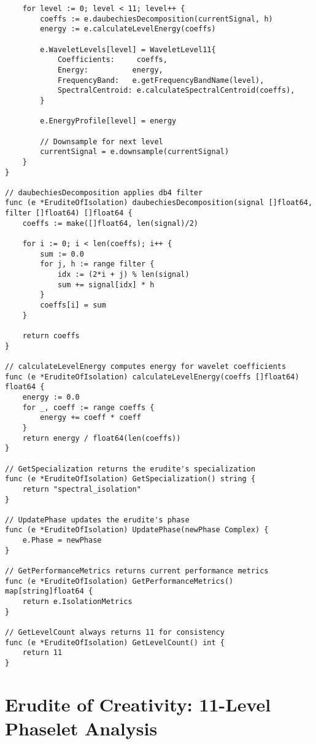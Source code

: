 \begin{tcolorbox}[colback=CodeBackground, colframe=DarkGray, title=Erudite of Isolation Implementation, fonttitle=\bfseries]
\begin{verbatim}
    for level := 0; level < 11; level++ {
        coeffs := e.daubechiesDecomposition(currentSignal, h)
        energy := e.calculateLevelEnergy(coeffs)
        
        e.WaveletLevels[level] = WaveletLevel11{
            Coefficients:     coeffs,
            Energy:          energy,
            FrequencyBand:   e.getFrequencyBandName(level),
            SpectralCentroid: e.calculateSpectralCentroid(coeffs),
        }
        
        e.EnergyProfile[level] = energy
        
        // Downsample for next level
        currentSignal = e.downsample(currentSignal)
    }
}

// daubechiesDecomposition applies db4 filter
func (e *EruditeOfIsolation) daubechiesDecomposition(signal []float64, filter []float64) []float64 {
    coeffs := make([]float64, len(signal)/2)
    
    for i := 0; i < len(coeffs); i++ {
        sum := 0.0
        for j, h := range filter {
            idx := (2*i + j) % len(signal)
            sum += signal[idx] * h
        }
        coeffs[i] = sum
    }
    
    return coeffs
}

// calculateLevelEnergy computes energy for wavelet coefficients
func (e *EruditeOfIsolation) calculateLevelEnergy(coeffs []float64) float64 {
    energy := 0.0
    for _, coeff := range coeffs {
        energy += coeff * coeff
    }
    return energy / float64(len(coeffs))
}

// GetSpecialization returns the erudite's specialization
func (e *EruditeOfIsolation) GetSpecialization() string {
    return "spectral_isolation"
}

// UpdatePhase updates the erudite's phase
func (e *EruditeOfIsolation) UpdatePhase(newPhase Complex) {
    e.Phase = newPhase
}

// GetPerformanceMetrics returns current performance metrics
func (e *EruditeOfIsolation) GetPerformanceMetrics() map[string]float64 {
    return e.IsolationMetrics
}

// GetLevelCount always returns 11 for consistency
func (e *EruditeOfIsolation) GetLevelCount() int {
    return 11
}
\end{verbatim}
\end{tcolorbox}

\section{Erudite of Creativity: 11-Level Phaselet Analysis}

